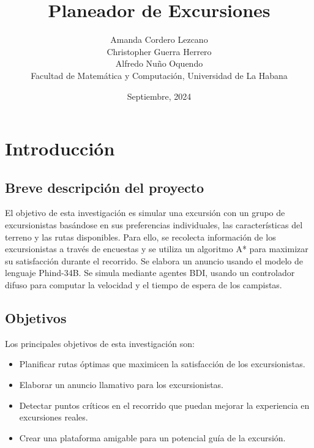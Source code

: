 \documentclass[10pt,twocolumn]{article}
\begin{document}
	\title{Planeador de Excursiones}
	\author{
		Amanda Cordero Lezcano\\
		Christopher Guerra Herrero\\
		Alfredo Nuño Oquendo\\Facultad de Matemática y Computación, Universidad de La Habana
	}
	\date{Septiembre, 2024}
	
	\section{Introducción}
	\subsection{Breve descripción del proyecto}
	El objetivo de esta investigación es simular una excursión con un grupo de excursionistas basándose en sus preferencias individuales, las características del terreno y las rutas disponibles. Para ello, se recolecta información de los excursionistas a través de encuestas y se utiliza un algoritmo A* para maximizar su satisfacción durante el recorrido. Se elabora un anuncio usando el modelo de lenguaje Phind-34B. Se simula mediante agentes BDI, usando un controlador difuso para computar la velocidad y el tiempo de espera de los campistas.
	
	\subsection{Objetivos}
	Los principales objetivos de esta investigación son:
	\begin{itemize}
		\item Planificar rutas óptimas que maximicen la satisfacción de los excursionistas.
		\item Elaborar un anuncio llamativo para los excursionistas.
		\item Detectar puntos críticos en el recorrido que puedan mejorar la experiencia en excursiones reales.
		\item Crear una plataforma amigable para un potencial guía de la excursión.
	\end{itemize}
	
\end{document}
